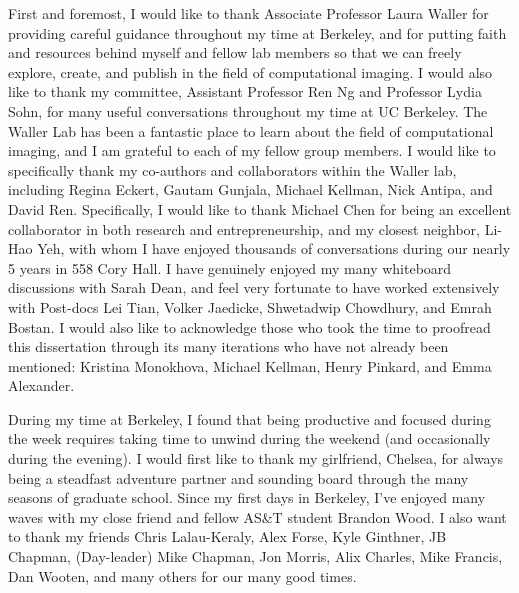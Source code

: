 \documentclass{ucbthesis}
\begin{document}
\begin{frontmatter}

\begin{dedication}
  
\end{dedication}


\tableofcontents
\clearpage
\listoffigures

\clearpage
\begin{acknowledgements}
First and foremost, I would like to thank Associate Professor Laura Waller for providing careful guidance throughout my time at Berkeley, and for putting faith and resources behind myself and fellow lab members so that we can freely explore, create, and publish in the field of computational imaging. I would also like to thank my committee, Assistant Professor Ren Ng and Professor Lydia Sohn, for many useful conversations throughout my time at UC Berkeley. The Waller Lab has been a fantastic place to learn about the field of computational imaging, and I am grateful to each of my fellow group members. I would like to specifically thank my co-authors and collaborators within the Waller lab, including Regina Eckert, Gautam Gunjala, Michael Kellman, Nick Antipa, and David Ren. Specifically, I would like to thank Michael Chen for being an excellent collaborator in both research and entrepreneurship, and my closest neighbor, Li-Hao Yeh, with whom I have enjoyed thousands of conversations during our nearly 5 years in 558 Cory Hall. I have genuinely enjoyed my many whiteboard discussions with Sarah Dean, and feel very fortunate to have worked extensively with Post-docs Lei Tian, Volker Jaedicke, Shwetadwip Chowdhury, and Emrah Bostan. I would also like to acknowledge those who took the time to proofread this dissertation through its many iterations who have not already been mentioned: Kristina Monokhova, Michael Kellman, Henry Pinkard, and Emma Alexander.

During my time at Berkeley, I found that being productive and focused during the week requires taking time to unwind during the weekend (and occasionally during the evening). I would first like to thank my girlfriend, Chelsea, for always being a steadfast adventure partner and sounding board through the many seasons of graduate school. Since my first days in Berkeley, I've enjoyed many waves with my close friend and fellow AS\&T student Brandon Wood. I also want to thank my friends Chris Lalau-Keraly, Alex Forse, Kyle Ginthner, JB Chapman, (Day-leader) Mike Chapman, Jon Morris, Alix Charles, Mike Francis, Dan Wooten, and many others for our many good times.


\end{acknowledgements}
\end{frontmatter}
\end{document}
